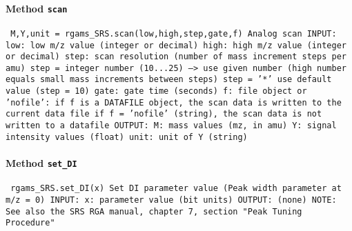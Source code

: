 \paragraph{Method \texttt{scan}}
\vspace{1ex}
\texttt{\newline
M,Y,unit = rgams_SRS.scan(low,high,step,gate,f)\newline
\newline
Analog scan\newline
\newline
INPUT:\newline
low: low m/z value (integer or decimal)\newline
high: high m/z value (integer or decimal)\newline
step: scan resolution (number of mass increment steps per amu)\newline
step = integer number (10...25) --> use given number (high number equals small mass increments between steps)\newline
step = '*' use default value (step = 10)\newline
gate: gate time (seconds)\newline
f: file object or 'nofile':\newline
if f is a DATAFILE object, the scan data is written to the current data file\newline
if f = 'nofile' (string), the scan data is not written to a datafile\newline
\newline
OUTPUT:\newline
M: mass values (mz, in amu)\newline
Y: signal intensity values (float)\newline
unit: unit of Y (string)\newline
\newline
}

\paragraph{Method \texttt{set_DI}}
\vspace{1ex}
\texttt{\newline
rgams_SRS.set_DI(x)\newline
\newline
Set DI parameter value (Peak width parameter at m/z = 0)\newline
\newline
INPUT:\newline
x: parameter value (bit units)\newline
\newline
OUTPUT:\newline
(none)\newline
\newline
NOTE:\newline
See also the SRS RGA manual, chapter 7, section "Peak Tuning Procedure"\newline
\newline
}

